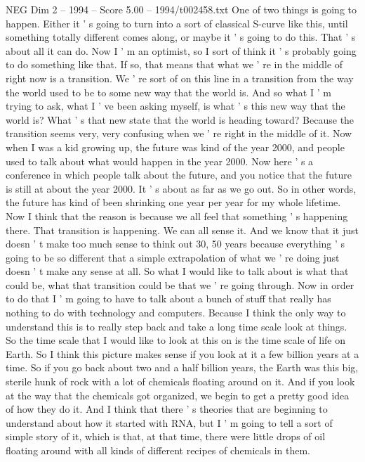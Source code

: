 \begin{textsample}{NEG Dim 2 – 1994 – Score 5.00 – 1994/t002458.txt}
One of two things is going to happen.
Either it ' s going to turn into a sort of classical S-curve like this, until something totally different comes along, or maybe it ' s going to do this.
That ' s about all it can do.
Now I ' m an optimist, so I sort of think it ' s probably going to do something like that.
If so, that means that what we ' re in the middle of right now is a transition.
We ' re sort of on this line in a transition from the way the world used to be to some new way that the world is.
And so what I ' m trying to ask, what I ' ve been asking myself, is what ' s this new way that the world is?
What ' s that new state that the world is heading toward?
Because the transition seems very, very confusing when we ' re right in the middle of it.
Now when I was a kid growing up, the future was kind of the year 2000, and people used to talk about what would happen in the year 2000.
Now here ' s a conference in which people talk about the future, and you notice that the future is still at about the year 2000.
It ' s about as far as we go out.
So in other words, the future has kind of been shrinking one year per year for my whole lifetime.
Now I think that the reason is because we all feel that something ' s happening there.
That transition is happening.
We can all sense it.
And we know that it just doesn ' t make too much sense to think out 30, 50 years because everything ' s going to be so different that a simple extrapolation of what we ' re doing just doesn ' t make any sense at all.
So what I would like to talk about is what that could be, what that transition could be that we ' re going through.
Now in order to do that I ' m going to have to talk about a bunch of stuff that really has nothing to do with technology and computers.
Because I think the only way to understand this is to really step back and take a long time scale look at things.
So the time scale that I would like to look at this on is the time scale of life on Earth.
So I think this picture makes sense if you look at it a few billion years at a time.
So if you go back about two and a half billion years, the Earth was this big, sterile hunk of rock with a lot of chemicals floating around on it.
And if you look at the way that the chemicals got organized, we begin to get a pretty good idea of how they do it.
And I think that there ' s theories that are beginning to understand about how it started with RNA, but I ' m going to tell a sort of simple story of it, which is that, at that time, there were little drops of oil floating around with all kinds of different recipes of chemicals in them.

\end{textsample}
